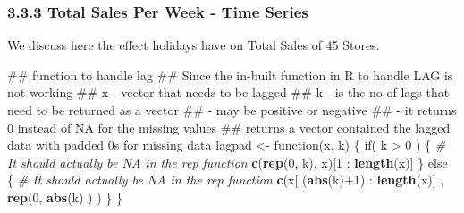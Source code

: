\documentclass[]{article}
\newenvironment{Shaded}{\begin{snugshade}}{\end{snugshade}}
\newcommand{\KeywordTok}[1]{\textcolor[rgb]{0.13,0.29,0.53}{\textbf{{#1}}}}
\newcommand{\DataTypeTok}[1]{\textcolor[rgb]{0.13,0.29,0.53}{{#1}}}
\newcommand{\DecValTok}[1]{\textcolor[rgb]{0.00,0.00,0.81}{{#1}}}
\newcommand{\StringTok}[1]{\textcolor[rgb]{0.31,0.60,0.02}{{#1}}}
\newcommand{\CommentTok}[1]{\textcolor[rgb]{0.56,0.35,0.01}{\textit{{#1}}}}
\newcommand{\NormalTok}[1]{{#1}}
\begin{document}
\subsubsection{3.3.3 Total Sales Per Week - Time
Series}\label{total-sales-per-week---time-series}

We discuss here the effect holidays have on Total Sales of 45 Stores.

\begin{Shaded}
\end{Shaded}

\begin{Shaded}
\begin{Highlighting}[]
\NormalTok{## function to handle lag}
\NormalTok{## Since the in-built function in R to handle LAG is not working}
\NormalTok{## x - vector that needs to be lagged}
\NormalTok{## k - is the no of lags that need to be returned as a vector }
\NormalTok{##   - may be positive or negative}
\NormalTok{##   - it returns 0 instead of NA for the missing values}
\NormalTok{## returns a vector contained the lagged data with padded 0s for missing data}
\NormalTok{lagpad <-}\StringTok{ }\NormalTok{function(x, k) \{}
  \NormalTok{if( k >}\StringTok{ }\DecValTok{0} \NormalTok{) \{}
    \CommentTok{# It should actually be NA in the rep function}
    \KeywordTok{c}\NormalTok{(}\KeywordTok{rep}\NormalTok{(}\DecValTok{0}\NormalTok{, k), x)[}\DecValTok{1} \NormalTok{:}\StringTok{ }\KeywordTok{length}\NormalTok{(x)] }
  \NormalTok{\} else \{}
    \CommentTok{# It should actually be NA in the rep function}
    \KeywordTok{c}\NormalTok{(x[ (}\KeywordTok{abs}\NormalTok{(k)+}\DecValTok{1}\NormalTok{) :}\StringTok{ }\KeywordTok{length}\NormalTok{(x)] , }\KeywordTok{rep}\NormalTok{(}\DecValTok{0}\NormalTok{, }\KeywordTok{abs}\NormalTok{(k) ) )  }
  \NormalTok{\}}
\NormalTok{\}}
\end{Highlighting}
\end{Shaded}
\end{document}
